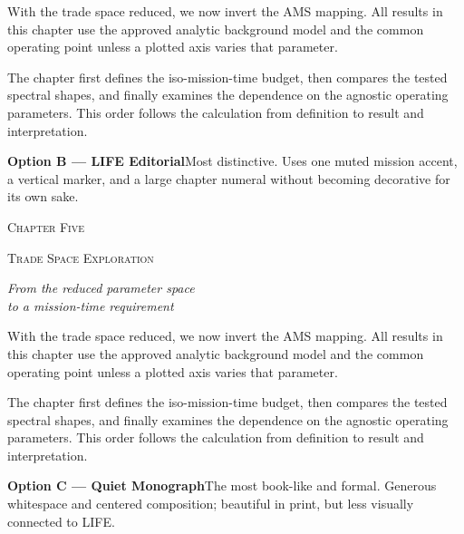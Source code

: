 \documentclass[12pt,a4paper]{article}
\newcommand{\sampleopening}{%
With the trade space reduced, we now invert the AMS mapping. All results in
this chapter use the approved analytic background model and the common
operating point unless a plotted axis varies that parameter.

The chapter first defines the iso-mission-time budget, then compares the
tested spectral shapes, and finally examines the dependence on the agnostic
operating parameters. This order follows the calculation from definition to
result and interpretation.%
}
\newcommand{\optionnote}[2]{%
    \vfill
    {\color{lifegray}\footnotesize
    \textbf{#1}\quad #2}
}
\begin{document}
\vspace{30mm}

\sampleopening

\optionnote{Option B --- LIFE Editorial}
{Most distinctive. Uses one muted mission accent, a vertical marker, and a
large chapter numeral without becoming decorative for its own sake.}

\clearpage

\thispagestyle{empty}
\vspace*{30mm}

\begin{center}
    {\color{lifegray}\fontsize{10}{12}\selectfont\scshape Chapter Five}

    \vspace{8mm}


    \vspace{8mm}

    {\fontsize{30}{34}\selectfont\scshape Trade Space Exploration}

    \vspace{7mm}

    {\color{lifegray}\large\itshape
    From the reduced parameter space\\
    to a mission-time requirement}
\end{center}

\vspace{28mm}

\sampleopening

\optionnote{Option C --- Quiet Monograph}
{The most book-like and formal. Generous whitespace and centered composition;
beautiful in print, but less visually connected to LIFE.}
\end{document}
